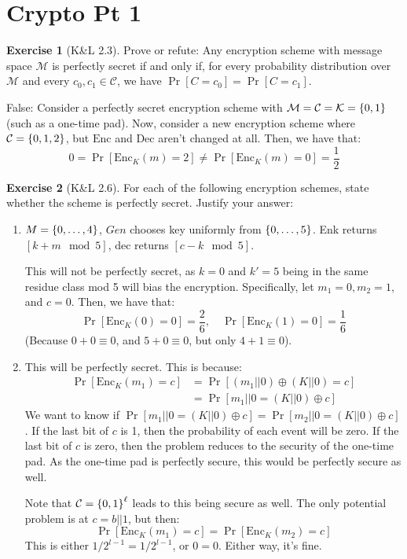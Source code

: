 \documentclass{article}
\theoremstyle{definition}
\newtheorem{exercise}{Exercise}[section]
\newcommand{\bin}{\Bqty{0,1}}
\newcommand{\enc}{\text{Enc}}
\begin{document}
\section{Crypto Pt 1}
\begin{exercise}[K\&L 2.3]
Prove or refute: Any encryption scheme with message space $\mathcal{M}$ is perfectly secret if and only if, for every probability distribution over $\mathcal{M}$ and every $c_0,c_1\in\mathcal{C}$, we have $\Pr[C = c_0] = \Pr[C = c_1]$.

False:
Consider a perfectly secret encryption scheme with $\mathcal{M} = \mathcal{C} = \mathcal{K} = \bin$ (such as a one-time pad).
Now, consider a new encryption scheme where $\mathcal{C} = \Bqty{0,1,2}$, but $\enc$ and $\text{Dec}$ aren't changed at all.
Then, we have that:
\begin{equation}
0 = \Pr[\enc_K(m) = 2] \neq \Pr[\enc_K(m) = 0] = \frac{1}{2}
\end{equation}
\end{exercise}
\begin{exercise}[K\&L 2.6]
For each of the following encryption schemes, state whether the scheme is perfectly secret.
Justify your answer:
\begin{enumerate}
\item $M = \Bqty{0,\dots,4}$, $Gen$ chooses key uniformly from $\Bqty{0,\dots,5}$.
Enk returns $[k+m\mod 5]$, dec returns $[c-k\mod 5]$.

This will not be perfectly secret, as $k = 0$ and $k' = 5$ being in the same residue class mod 5 will bias the encryption.
Specifically, let $m_1 = 0, m_2 = 1$, and $c = 0$.
Then, we have that:
\begin{equation}
\Pr[\enc_K(0) = 0] = \frac{2}{6},\quad \Pr[\enc_K(1) = 0] = \frac{1}{6}
\end{equation}
(Because $0+0\equiv 0$, and $5+0\equiv 0$, but only $4+1\equiv 0$).
\item This will be perfectly secret.
This is because:
\begin{align*}
\Pr[\enc_K(m_1) = c] &= \Pr[(m_1||0)\oplus (K||0) = c] \\\
& = \Pr[m_1||0 = (K||0)\oplus c]
\end{align*}
We want to know if $\Pr[m_1 || 0 = (K||0)\oplus c] = \Pr[m_2||0 = (K||0)\oplus c]$.
If the last bit of $c$ is 1, then the probability of each event will be zero.
If the last bit of $c$ is zero, then the problem reduces to the security of the one-time pad.
As the one-time pad is perfectly secure, this would be perfectly secure as well.

Note that $\mathcal{C} = \bin^\ell$ leads to this being secure as well.
The only potential problem is at $c = b||1$, but then:
\begin{equation}
\Pr[\enc_K(m_1) = c] = \Pr[\enc_K(m_2) =c]
\end{equation}
This is either $1/2^{l-1} = 1/2^{l-1}$, or $0 = 0$.
Either way, it's fine.
\end{enumerate}
\end{exercise}
\end{document}

